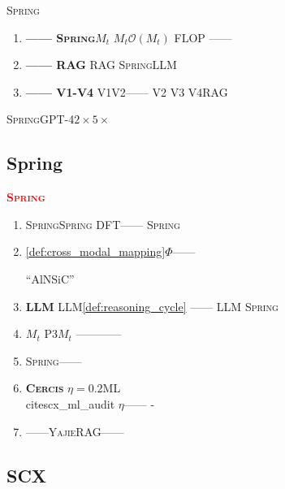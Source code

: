\documentclass[12pt,a4paper]{article}
\theoremstyle{remark}
\newcommand{\Spring}{\textsc{Spring}}
\newcommand{\Yajie}{\textsc{Yajie}}
\newcommand{\Cercis}{\textsc{Cercis}}
\newcommand{\honestcrit}[1]{%
    \textcolor{red}{\textbf{#1}}%
}
\begin{document}
\Spring{}

\begin{enumerate}[label=(\arabic*),itemsep=3pt]
    \item \textbf{ —— \Spring{}$M_t$}
    \cite{scx_spring_trainer}$M_t$$\mathcal{O}(M_t)$
    FLOP
    ——

    \item \textbf{ —— RAG}
    RAG
    \Spring{}LLM

    \item \textbf{ —— V1-V4}
    V1V2——
    V2
    V3
    V4RAG
\end{enumerate}

\Spring{}GPT-4$2\times$$5\times$
\textbf{}


\subsection{Spring}

\honestcrit{\Spring{}
}

\begin{enumerate}[label=\textbf{H\arabic*},leftmargin=*,itemsep=5pt]
    \item \textbf{}
    \Spring{}\Spring{}
    DFT——
    \Spring{}
    

    \item \textbf{}
    \ref{def:cross_modal_mapping}$\Phi$——
    
    “AlNSiC”
    

    \item \textbf{LLM}
    LLM\ref{def:reasoning_cycle}
    ——
    LLM
    \Spring{}

    \item \textbf{$M_t$}
    P3$M_t$
    ————
    

    \item \textbf{}
    \Spring{}——
    
    

    \item \textbf{\Cercis{}}
    $\eta=0.2$ML~\\cite{scx_ml_audit}
    $\eta$——
    -

    \item \textbf{}
    ——\Yajie{}RAG——
    
    
\end{enumerate}

\subsection{SCX}
\end{document}

